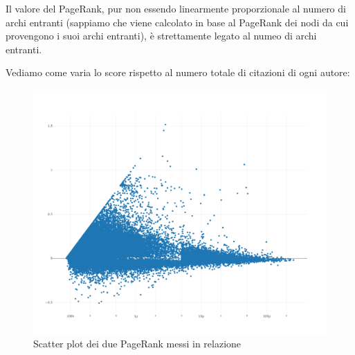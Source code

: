 \documentclass[a4paper, 12pt]{article}
\begin{document}
Il valore del PageRank, pur non essendo linearmente proporzionale al numero di archi entranti (sappiamo che viene calcolato in base al PageRank dei nodi da cui provengono i suoi archi entranti), è strettamente legato al numeo di archi entranti.
\par Vediamo come varia lo score rispetto al numero totale di citazioni di ogni autore:
\begin{figure}[H]
  \includegraphics[width=\linewidth]{images/grafico-3.png}
  \caption{Scatter plot dei due PageRank messi in relazione}
\end{figure}

\medskip
 


\end{document}
